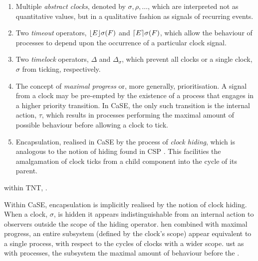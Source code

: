 \documentclass[orivec,envcountsame]{llncs}
\begin{document}
\begin{enumerate}
\item Multiple \emph{abstract clocks}, denoted by $\sigma, \rho, \dots$,
      which are interpreted not as quantitative values, but in a
      qualitative fashion as signals of recurring events.
\item Two \emph{timeout} operators, $\lfloor{E}\rfloor {\sigma} ({F})$ and
      $\lceil{E}\rceil {\sigma} ({F})$, which allow the behaviour of
      processes to depend upon the occurrence of a particular clock
      signal.
\item Two \emph{timelock} operators, $\Delta$ and $\Delta_{\sigma}$,
      which prevent all clocks \AJH{(}{,}or a single
      clock, $\sigma$\AJH{)}{,} from ticking, respectively.
\item The concept of \emph{maximal progress} or, more generally,
      prioritisation.  A signal from a clock may be pre-empted by the
      existence of a process that engages in a higher priority
      transition.  In CaSE, the only such transition is the internal action,
      $\tau$, which results in processes performing the maximal amount
      of possible behaviour before allowing a clock to tick.
\item Encapsulation, realised in CaSE by the process of \emph{clock
      hiding}, which is analogous to the notion of hiding found in
      CSP \cite{hoare:csp78}.  This facilities the amalgamation of clock ticks
      from a child component into the cycle of its parent.
\end{enumerate}

 within TNT,
.

Within CaSE, encapsulation is implicitly realised by the notion of clock
hiding.  When a clock, $\sigma$, is hidden it appears indistinguishable
from an internal action to observers outside the scope of the hiding
operator.  hen combined with maximal
progress,  an entire subsystem (defined by
the clock's scope) appear equivalent to a single
process, with respect to the cycles of clocks with a wider scope.
ust as with processes, the subsystem
 the maximal amount of behaviour before the
.
\end{document}
